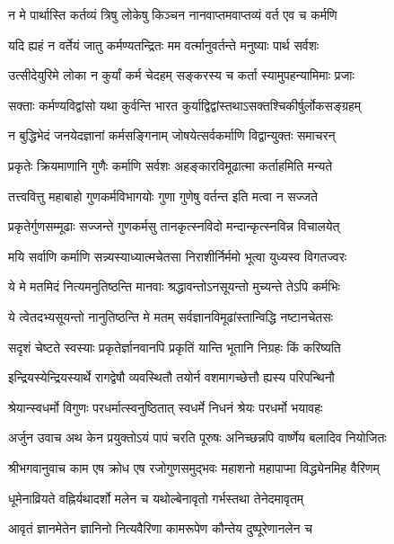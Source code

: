 \twolineshloka
{न मे पार्थास्ति कर्तव्यं त्रिषु लोकेषु किञ्चन}
{नानवाप्तमवाप्तव्यं वर्त एव च कर्मणि}%

\twolineshloka
{यदि ह्यहं न वर्तेयं जातु कर्मण्यतन्द्रितः}
{मम वर्त्मानुवर्तन्ते मनुष्याः पार्थ सर्वशः}%

\twolineshloka
{उत्सीदेयुरिमे लोका न कुर्यां कर्म चेदहम्}
{सङ्करस्य च कर्ता स्यामुपहन्यामिमाः प्रजाः}%

\twolineshloka
{सक्ताः कर्मण्यविद्वांसो यथा कुर्वन्ति भारत}
{कुर्याद्विद्वांस्तथाऽसक्तश्चिकीर्षुर्लोकसङ्ग्रहम्}%

\twolineshloka
{न बुद्धिभेदं जनयेदज्ञानां कर्मसङ्गिनाम्}
{जोषयेत्सर्वकर्माणि विद्वान्युक्तः समाचरन्}%

\twolineshloka
{प्रकृतेः क्रियमाणानि गुणैः कर्माणि सर्वशः}
{अहङ्कारविमूढात्मा कर्ताहमिति मन्यते}%

\twolineshloka
{तत्त्ववित्तु महाबाहो गुणकर्मविभागयोः}
{गुणा गुणेषु वर्तन्त इति मत्वा न सज्जते}%

\twolineshloka
{प्रकृतेर्गुणसम्मूढाः सज्जन्ते गुणकर्मसु}
{तानकृत्स्नविदो मन्दान्कृत्स्नविन्न विचालयेत्}%

\twolineshloka
{मयि सर्वाणि कर्माणि सन्न्यस्याध्यात्मचेतसा}
{निराशीर्निर्ममो भूत्वा युध्यस्व विगतज्वरः}%

\twolineshloka
{ये मे मतमिदं नित्यमनुतिष्ठन्ति मानवाः}
{श्रद्धावन्तोऽनसूयन्तो मुच्यन्ते तेऽपि कर्मभिः}%

\twolineshloka
{ये त्वेतदभ्यसूयन्तो नानुतिष्ठन्ति मे मतम्}
{सर्वज्ञानविमूढांस्तान्विद्धि नष्टानचेतसः}%

\twolineshloka
{सदृशं चेष्टते स्वस्याः प्रकृतेर्ज्ञानवानपि}
{प्रकृतिं यान्ति भूतानि निग्रहः किं करिष्यति}%

\twolineshloka
{इन्द्रियस्येन्द्रियस्यार्थे रागद्वेषौ व्यवस्थितौ}
{तयोर्न वशमागच्छेत्तौ ह्यस्य परिपन्थिनौ}%

\twolineshloka
{श्रेयान्स्वधर्मो विगुणः परधर्मात्स्वनुष्ठितात्}
{स्वधर्मे निधनं श्रेयः परधर्मो भयावहः}%

{अर्जुन उवाच}
\twolineshloka
{अथ केन प्रयुक्तोऽयं पापं चरति पूरुषः}
{अनिच्छन्नपि वार्ष्णेय बलादिव नियोजितः}%

{श्रीभगवानुवाच}
\twolineshloka
{काम एष क्रोध एष रजोगुणसमुद्भवः}
{महाशनो महापाप्मा विद्ध्येनमिह वैरिणम्}%

\twolineshloka
{धूमेनाव्रियते वह्निर्यथादर्शो मलेन च}
{यथोल्बेनावृतो गर्भस्तथा तेनेदमावृतम्}%

\twolineshloka
{आवृतं ज्ञानमेतेन ज्ञानिनो नित्यवैरिणा}
{कामरूपेण कौन्तेय दुष्पूरेणानलेन च}%


